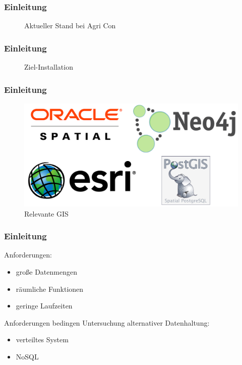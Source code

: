 \documentclass{beamer}
\begin{document}
\begin{frame}\frametitle{Einleitung}
\begin{figure}
\centering

\caption{Aktueller Stand bei Agri Con}
\end{figure}
\end{frame}

\begin{frame}\frametitle{Einleitung}
\begin{figure}[h!]
\centering
\resizebox{.92\linewidth}{!}{}
\caption{Ziel-Installation}
\end{figure}
\end{frame}

\begin{frame}\frametitle{Einleitung}
\begin{figure}
\centering
\includegraphics[width=1\hsize]{Logos.png}
\caption{Relevante GIS}
\end{figure}
\end{frame}

\begin{frame}\frametitle{Einleitung}
\begin{block}{Anforderungen:}
\begin{itemize}
\item große Datenmengen
\item räumliche Funktionen
\item geringe Laufzeiten
\end{itemize}
\end{block}
\vspace{\baselineskip}
\vspace{\baselineskip}
\begin{block}{
Anforderungen bedingen Untersuchung alternativer Datenhaltung:}
\begin{itemize}
\item verteiltes System
\item NoSQL
\end{itemize}
\end{block}
\end{frame}
\end{document}

